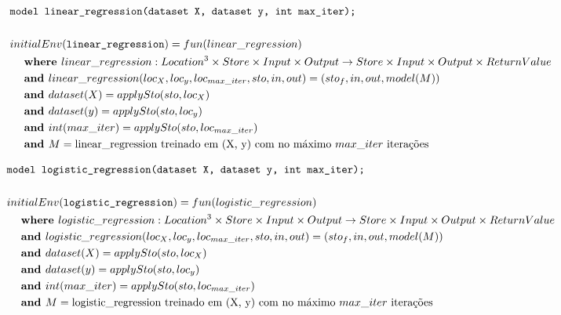 \documentclass[12pt]{article}
\begin{document}
\begin{align*}
	&\texttt{model linear\_regression(dataset X, dataset y, int max\_iter);} \\
	\\
&initialEnv(\texttt{linear\_regression}) = fun(linear\_regression) \\
&\hspace{3ex}\textbf{where } linear\_regression:Location^3\times Store\times Input\times Output\rightarrow Store\times Input\times Output\times ReturnValue \\
&\hspace{3ex}\textbf{and } linear\_regression(loc_{X}, loc_{y}, loc_{max\_iter},sto,in,out) = (sto_f,in,out,model(M))\\
&\hspace{3ex}\textbf{and } dataset(X) = applySto(sto, loc_{X}) \\
&\hspace{3ex}\textbf{and } dataset(y) = applySto(sto, loc_{y}) \\
&\hspace{3ex}\textbf{and } int(max\_iter) = applySto(sto, loc_{max\_iter}) \\
&\hspace{3ex}\textbf{and } M = \text{linear\_regression treinado em (X, y) com no máximo $max\_iter$ iterações}  \\
\end{align*}

\begin{align*}
	&\texttt{model logistic\_regression(dataset X, dataset y, int max\_iter);} \\
	\\
&initialEnv(\texttt{logistic\_regression}) = fun(logistic\_regression) \\
&\hspace{3ex}\textbf{where } logistic\_regression:Location^3\times Store\times Input\times Output\rightarrow Store\times Input\times Output\times ReturnValue \\
&\hspace{3ex}\textbf{and } logistic\_regression(loc_{X}, loc_{y}, loc_{max\_iter},sto,in,out) = (sto_f,in,out,model(M))\\
&\hspace{3ex}\textbf{and } dataset(X) = applySto(sto, loc_{X}) \\
&\hspace{3ex}\textbf{and } dataset(y) = applySto(sto, loc_{y}) \\
&\hspace{3ex}\textbf{and } int(max\_iter) = applySto(sto, loc_{max\_iter}) \\
&\hspace{3ex}\textbf{and } M = \text{logistic\_regression treinado em (X, y) com no máximo $max\_iter$ iterações}  \\
\end{align*}
\end{document}
